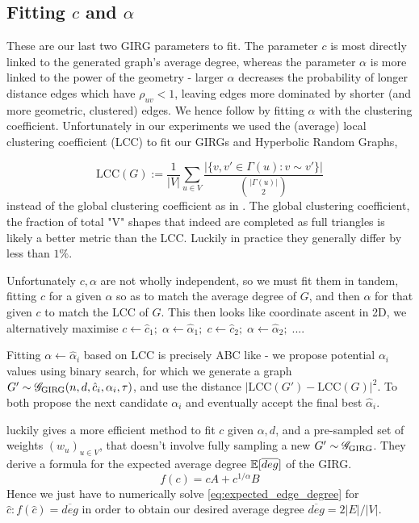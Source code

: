 \subsection{Fitting $c$ and $\alpha$}
These are our last two GIRG parameters to fit.
The parameter $c$ is most directly linked to the generated graph's average degree, whereas the parameter $\alpha$ is more linked to the power of the geometry - larger $\alpha$ decreases the probability of longer distance edges which have $\rho_{uv} < 1$, leaving edges more dominated by shorter (and more geometric, clustered) edges. We hence follow \cite{blasius2018towards} by fitting $\alpha$ with the clustering coefficient. Unfortunately in our experiments we used the (average) local clustering coefficient (LCC) to fit our GIRGs and Hyperbolic Random Graphs, 

\begin{equation}
    \mathrm{LCC}(G) := \frac{1}{|V|} \sum_{u \in V} 
    \frac{| \{ v, v' \in \Gamma(u): v \sim v'\} |}{{|\Gamma(u)| \choose 2}}
\end{equation}
instead of the global clustering coefficient as in \cite{blasius2018towards}. The global clustering coefficient, the fraction of total "V" shapes that indeed are completed as full triangles is likely a better metric than the LCC. Luckily in practice they generally differ by less than $1\%$.

Unfortunately $c, \alpha$ are not wholly independent, so we must fit them in tandem, fitting $c$ for a given $\alpha$ so as to match the average degree of $G$, and then $\alpha$ for that given $c$ to match the LCC of $G$. This then looks like coordinate ascent in 2D, we alternatively maximise $c \gets \hat{c}_1;\; \alpha \gets \hat{\alpha}_1;\; c \gets \hat{c}_2;\; \alpha \gets \hat{\alpha}_2;\; ...$.

Fitting $\alpha \gets \hat{\alpha}_i$ based on LCC is precisely ABC like - we propose potential $\alpha_i$ values using binary search, for which we generate a graph $G' \sim \mathscr{G}_{\mathrm{GIRG}}(n, d, \hat{c}_i, \alpha_i, \tau)$, and use the distance $|\mathrm{LCC}(G') - \mathrm{LCC}(G)|^2$. To both propose the next candidate $\alpha_i$ and eventually accept the final best $\hat{\alpha}_i$.

\cite{blasius2022efficiently} luckily gives a more efficient method to fit $c$ given $\alpha, d$, and a pre-sampled set of weights $(w_u)_{u \in V}$, that doesn't involve fully sampling a new $G' \sim \mathscr{G}_{\mathrm{GIRG}}$. They derive a formula for the expected average degree $\mathbb{E}[\overline{deg}]$ of the GIRG.
\begin{equation}
    \label{eq:expected_edge_degree}
    f(c) = c A + c^{1/\alpha} B
\end{equation}
Hence we just have to numerically solve \cref{eq:expected_edge_degree} for $\hat{c}: f(\hat{c}) = \overline{deg}$ in order to obtain our desired average degree $\overline{deg} = 2|E|/|V|$.

